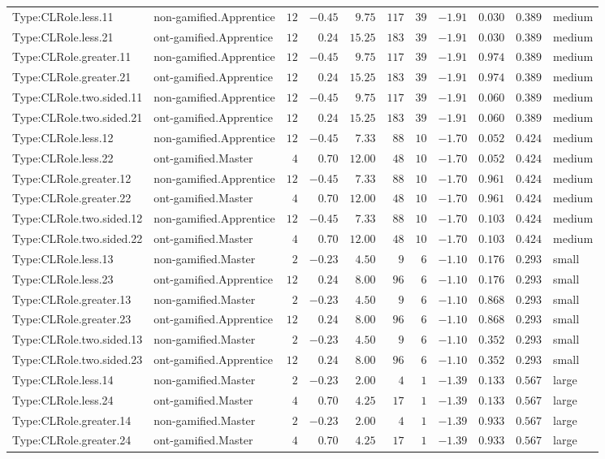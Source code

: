 \documentclass[6pt,a4paper]{article}
\begin{document}
{\begin{longtable}{llrrrrrrrrl}
Type:CLRole.less.11&non-gamified.Apprentice&$12$&$-0.45$&$ 9.75$&$117$&$39$&$-1.91$&$0.030$&$0.389$&medium\tabularnewline
Type:CLRole.less.21&ont-gamified.Apprentice&$12$&$ 0.24$&$15.25$&$183$&$39$&$-1.91$&$0.030$&$0.389$&medium\tabularnewline
Type:CLRole.greater.11&non-gamified.Apprentice&$12$&$-0.45$&$ 9.75$&$117$&$39$&$-1.91$&$0.974$&$0.389$&medium\tabularnewline
Type:CLRole.greater.21&ont-gamified.Apprentice&$12$&$ 0.24$&$15.25$&$183$&$39$&$-1.91$&$0.974$&$0.389$&medium\tabularnewline
Type:CLRole.two.sided.11&non-gamified.Apprentice&$12$&$-0.45$&$ 9.75$&$117$&$39$&$-1.91$&$0.060$&$0.389$&medium\tabularnewline
Type:CLRole.two.sided.21&ont-gamified.Apprentice&$12$&$ 0.24$&$15.25$&$183$&$39$&$-1.91$&$0.060$&$0.389$&medium\tabularnewline
Type:CLRole.less.12&non-gamified.Apprentice&$12$&$-0.45$&$ 7.33$&$ 88$&$10$&$-1.70$&$0.052$&$0.424$&medium\tabularnewline
Type:CLRole.less.22&ont-gamified.Master&$ 4$&$ 0.70$&$12.00$&$ 48$&$10$&$-1.70$&$0.052$&$0.424$&medium\tabularnewline
Type:CLRole.greater.12&non-gamified.Apprentice&$12$&$-0.45$&$ 7.33$&$ 88$&$10$&$-1.70$&$0.961$&$0.424$&medium\tabularnewline
Type:CLRole.greater.22&ont-gamified.Master&$ 4$&$ 0.70$&$12.00$&$ 48$&$10$&$-1.70$&$0.961$&$0.424$&medium\tabularnewline
Type:CLRole.two.sided.12&non-gamified.Apprentice&$12$&$-0.45$&$ 7.33$&$ 88$&$10$&$-1.70$&$0.103$&$0.424$&medium\tabularnewline
Type:CLRole.two.sided.22&ont-gamified.Master&$ 4$&$ 0.70$&$12.00$&$ 48$&$10$&$-1.70$&$0.103$&$0.424$&medium\tabularnewline
Type:CLRole.less.13&non-gamified.Master&$ 2$&$-0.23$&$ 4.50$&$  9$&$ 6$&$-1.10$&$0.176$&$0.293$&small\tabularnewline
Type:CLRole.less.23&ont-gamified.Apprentice&$12$&$ 0.24$&$ 8.00$&$ 96$&$ 6$&$-1.10$&$0.176$&$0.293$&small\tabularnewline
Type:CLRole.greater.13&non-gamified.Master&$ 2$&$-0.23$&$ 4.50$&$  9$&$ 6$&$-1.10$&$0.868$&$0.293$&small\tabularnewline
Type:CLRole.greater.23&ont-gamified.Apprentice&$12$&$ 0.24$&$ 8.00$&$ 96$&$ 6$&$-1.10$&$0.868$&$0.293$&small\tabularnewline
Type:CLRole.two.sided.13&non-gamified.Master&$ 2$&$-0.23$&$ 4.50$&$  9$&$ 6$&$-1.10$&$0.352$&$0.293$&small\tabularnewline
Type:CLRole.two.sided.23&ont-gamified.Apprentice&$12$&$ 0.24$&$ 8.00$&$ 96$&$ 6$&$-1.10$&$0.352$&$0.293$&small\tabularnewline
Type:CLRole.less.14&non-gamified.Master&$ 2$&$-0.23$&$ 2.00$&$  4$&$ 1$&$-1.39$&$0.133$&$0.567$&large\tabularnewline
Type:CLRole.less.24&ont-gamified.Master&$ 4$&$ 0.70$&$ 4.25$&$ 17$&$ 1$&$-1.39$&$0.133$&$0.567$&large\tabularnewline
Type:CLRole.greater.14&non-gamified.Master&$ 2$&$-0.23$&$ 2.00$&$  4$&$ 1$&$-1.39$&$0.933$&$0.567$&large\tabularnewline
Type:CLRole.greater.24&ont-gamified.Master&$ 4$&$ 0.70$&$ 4.25$&$ 17$&$ 1$&$-1.39$&$0.933$&$0.567$&large\tabularnewline

\end{longtable}}
\end{document}
